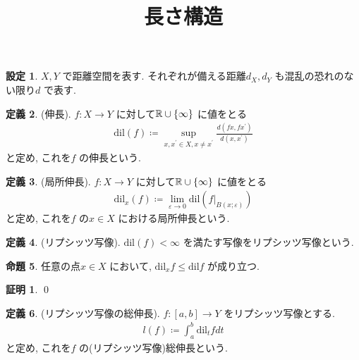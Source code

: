 \documentclass[10pt, fleqn, label-section=none]{bxjsarticle}
\title{長さ構造}
\date{}
\author{}
\theoremstyle{definition}
\newtheorem{dfn}{定義}[section]
\newtheorem{prop}[dfn]{命題}
\newtheorem{setting}[dfn]{設定}
\newtheorem*{pf*}{証明}
\newcommand{\veps}{\varepsilon}
\newcommand{\cbra}[1]{\mleft\{#1\mright\}}
\renewcommand{\;}{\, ; \,}
\begin{document}
\maketitle



\section{}

\begin{setting}
$X, Y$ で距離空間を表す. それぞれが備える距離$d_X, d_Y$ も混乱の恐れのない限り$d$ で表す. 

\end{setting}

\begin{dfn}(伸長). $f: X \rightarrow Y$ に対して$\mathbb R \cup \cbra{\infty}$ に値をとる
\begin{align*} \textrm{dil} (f) \coloneqq \sup_{x, x^\prime \in X, x \neq x^\prime } \frac{d(fx, fx^\prime )}{ d(x, x^\prime) } \end{align*} 
と定め, これを$f$ の伸長という. 

\end{dfn}

\begin{dfn}(局所伸長). $f: X \rightarrow Y$ に対して$\mathbb R \cup \cbra{\infty}$ に値をとる
\begin{align*} \textrm{dil}_x (f) \coloneqq \lim_{\veps \rightarrow 0} \textrm{dil}(f | _ {B(x; \veps)}) \end{align*} 
と定め, これを$f$ の$x \in X$ における局所伸長という. 

\end{dfn}

\begin{dfn}(リプシッツ写像). $\textrm{dil} (f) < \infty$ を満たす写像をリプシッツ写像という. 

\end{dfn}

\begin{prop}
任意の点$x \in X$ において, $\textrm{dil}_x f \leq \textrm{dil} f$ が成り立つ. 
\end{prop}
\begin{pf*}

\qed
\end{pf*}


\begin{dfn}(リプシッツ写像の総伸長). $f : [a, b] \rightarrow Y$ をリプシッツ写像とする. 
\begin{align*} l(f) \coloneqq \int_a^b \textrm{dil} _t f dt \end{align*} 
と定め, これを$f$ の(リプシッツ写像)総伸長という. 
\end{dfn}
\end{document}
